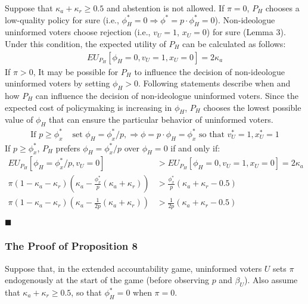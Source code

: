 \par Suppose that $\kappa_a + \kappa_r \geq 0.5$ and abstention is not allowed. If $\pi=0$, $P_H$ chooses a low-quality policy for sure (i.e., $\phi^*_H=0 \Rightarrow \phi^* = p \cdot \phi^*_H = 0$). Non-ideologue uninformed voters choose rejection (i.e., $v_U=1$, $x_U=0$) for sure (Lemma 3). Under this condition, the expected utility of $P_H$ can be calculated as follows:
\begin{align*}
EU_{P_H}[\phi_H=0, v_U=1, x_U=0] = 2 \kappa_a
\end{align*}
\noindent If $\pi>0$, It may be possible for $P_H$ to influence the decision of non-ideologue uninformed voters by setting $\phi_H>0$. Following statements describe when and how $P_H$ can influence the decision of non-ideologue uninformed voters. Since the expected cost of policymaking is increasing in $\phi_H$, $P_H$ chooses the lowest possible value of $\phi_H$ that can ensure the particular behavior of uninformed voters.  
\begin{align*}
\text{If } p \geq \phi^*_{x} &\text{ set } \phi_H = \phi^*_{x}/p, \Rightarrow \phi = p \cdot \phi_H = \phi^*_{x} \text{ so that } v^*_U = 1, x^*_U = 1 
\end{align*}
\noindent If $p \geq \phi^*_{x}$, $P_H$ prefers $\phi_H = \phi^*_{x}/p$ over $\phi_H = 0$ if and only if:
\begin{align*}
EU_{P_H}[\phi_H = \phi^*_{x}/p, v_U = 0] &> EU_{P_H}[\phi_H=0, v_U=1, x_U=0] = 2 \kappa_a \\ 
\pi (1-\kappa_a-\kappa_r)\left(\kappa_a - \frac{\phi^*_{x}}{p}(\kappa_a + \kappa_r)\right) &> \frac{\phi^*_{x}}{p} (\kappa_a + \kappa_r - 0.5) \\
\pi (1-\kappa_a-\kappa_r)\left(\kappa_a - \frac{1}{2p}(\kappa_a + \kappa_r)\right) &> \frac{1}{2p} (\kappa_a + \kappa_r - 0.5)
\end{align*}

\hfill $\blacksquare$

\subsubsection{The Proof of Proposition 8}

\par Suppose that, in the extended accountability game, uninformed voters $U$ sets $\pi$ endogenously at the start of the game (before observing $p$ and $\beta_U$). Also assume that $\kappa_a + \kappa_r \geq 0.5$, so that $\phi^*_H=0$ when $\pi=0$. 


